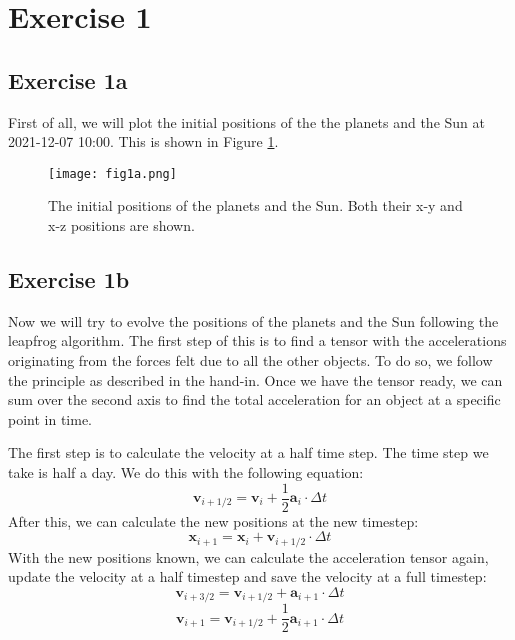 \section{Exercise 1}
\subsection{Exercise 1a}

First of all, we will plot the initial positions of the the planets and the Sun at 2021-12-07 10:00. This is shown in Figure \ref{fig:1a}. 

\begin{figure}[h!]
  \centering
  \texttt{[image: fig1a.png]}
  \caption{The initial positions of the planets and the Sun. Both their x-y and x-z positions are shown. }
  \label{fig:1a}
\end{figure}

\subsection{Exercise 1b}
Now we will try to evolve the positions of the planets and the Sun following the leapfrog algorithm. The first step of this is to find a tensor with the accelerations originating from the forces felt due to all the other objects. To do so, we follow the principle as described in the hand-in. Once we have the tensor ready, we can sum over the second axis to find the total acceleration for an object at a specific point in time. 

The first step is to calculate the velocity at a half time step. The time step we take is half a day. We do this with the following equation: 
\begin{equation}
    \mathbf{v}_{i+1/2} = \mathbf{v}_i + \frac{1}{2}\mathbf{a}_i \cdot \Delta t
\end{equation}
After this, we can calculate the new positions at the new timestep: 
\begin{equation}
    \mathbf{x}_{i+1} = \mathbf{x}_i + \mathbf{v}_{i+1/2} \cdot \Delta t
\end{equation}
With the new positions known, we can calculate the acceleration tensor again, update the velocity at a half timestep and save the velocity at a full timestep: 
\begin{equation}
    \mathbf{v}_{i+3/2} = \mathbf{v}_{i+1/2} + \mathbf{a}_{i+1} \cdot \Delta t
\end{equation}
\begin{equation}
    \mathbf{v}_{i+1} = \mathbf{v}_{i+1/2} + \frac{1}{2}\mathbf{a}_{i+1} \cdot \Delta t
\end{equation}

